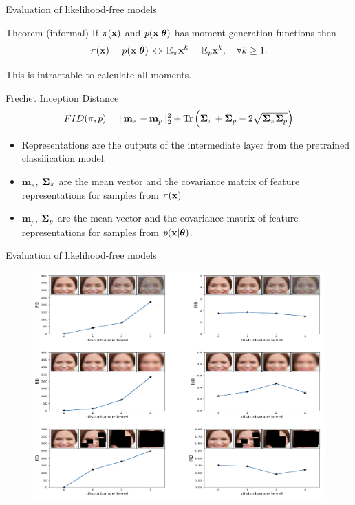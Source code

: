 \documentclass{beamer}
\begin{document}
\begin{frame}{Evaluation of likelihood-free models}
	\begin{block}{Theorem (informal)}
		If $\pi(\mathbf{x})$ and $p(\mathbf{x} | \boldsymbol{\theta})$ has moment generation functions then
		\vspace{-0.1cm}
		\[
			\pi(\mathbf{x}) = p(\mathbf{x} | \boldsymbol{\theta}) \, \Leftrightarrow \, \mathbb{E}_{\pi} \mathbf{x}^k = \mathbb{E}_{p} \mathbf{x}^k, \quad \forall k \geq 1.
		\]
		\vspace{-0.7cm}
	\end{block}
	This is intractable to calculate all moments.
	\begin{block}{Frechet Inception Distance}
		\vspace{-0.3cm}
		\[
			FID (\pi, p) = \| \mathbf{m}_{\pi} - \mathbf{m}_{p}\|_2^2 + \text{Tr} \left( \boldsymbol{\Sigma}_{\pi} + \boldsymbol{\Sigma}_p - 2 \sqrt{\boldsymbol{\Sigma}_{\pi} \boldsymbol{\Sigma}_p} \right)
		\]
		\vspace{-0.5cm}
	\end{block}
	\begin{itemize}
		\item Representations are the outputs of the intermediate layer from the pretrained classification model.
		\item $\mathbf{m}_{\pi}$, $\boldsymbol{\Sigma}_{\pi} $ are the mean vector and the covariance matrix of feature representations for samples from $\pi(\mathbf{x})$
		\item $\mathbf{m}_{p}$, $\boldsymbol{\Sigma}_p$ are the mean vector and the covariance matrix of feature representations for samples from $p(\mathbf{x} | \boldsymbol{\theta})$.
	\end{itemize} 

\end{frame}
\begin{frame}{Evaluation of likelihood-free models}
	\begin{figure}
		\centering
		\includegraphics[width=0.9\linewidth]{figs/fid_results}
	\end{figure}
\end{frame}
\end{document}
